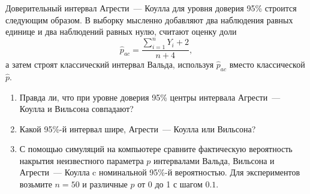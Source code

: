 \begin{enumerate}[resume]
\begin{enumerate}[resume]
\end{enumerate}

Доверительный интервал Агрести~— Коулла для уровня доверия 95\% строится следующим образом.
В выборку мысленно добавляют два наблюдения равных единице и два наблюдений равных нулю,
считают оценку доли
\[
\hat p_{ac} = \frac{\sum_{i=1}^n Y_i + 2}{n + 4},  
\] 
а затем строят классический интервал Вальда, используя $\hat p_{ac}$ вместо классической $\hat p$. 

  
\begin{enumerate}[resume]
  \item Правда ли, что при уровне доверия 95\% центры интервала Агрести~— Коулла и Вильсона совпадают?
  \item Какой 95\%-й интервал шире, Агрести~— Коулла или Вильсона?
  \item С помощью симуляций на компьютере сравните фактическую вероятность накрытия 
  неизвестного параметра $p$ интервалами Вальда, Вильсона и Агрести~— Коулла
  c номинальной 95\%-й вероятностью. 
  Для экспериментов возьмите $n=50$ и различные $p$ от 0 до 1 с шагом $0.1$.

\end{enumerate}


\end{enumerate}


